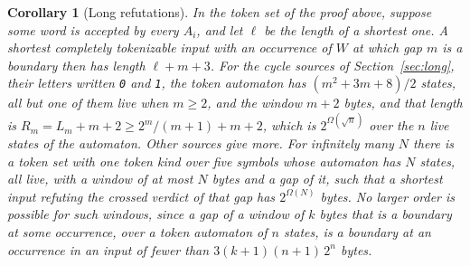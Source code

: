 \documentclass[11pt,a4paper]{article}
\theoremstyle{definition}
\theoremstyle{plain}
\newtheorem{corollary}{Corollary}
\newcommand{\code}[1]{\texttt{#1}}
\begin{document}
\begin{corollary}[Long refutations]
\label{cor:gap-long}
In the token set of the proof above, suppose some word is accepted by every $A_i$, and let $\ell$ be the length of a
shortest one. A shortest completely tokenizable input with an occurrence of $W$ at which gap $m$ is a boundary then has
length $\ell + m + 3$. For the cycle sources of Section~\ref{sec:long}, their letters written \code{0} and \code{1}, the
token automaton has $(m^2 + 3m + 8)/2$ states, all but one of them live when $m \geq 2$, and the window $m + 2$ bytes,
and that length is $R_m = L_m + m + 2 \geq 2^m / (m + 1) + m + 2$, which is $2^{\Omega(\sqrt n)}$ over the $n$ live
states of the automaton. Other sources give more. For infinitely many $N$ there is a token set with one token kind over
five symbols whose automaton has $N$ states, all live, with a window of at most $N$ bytes and a gap of it, such that a
shortest input refuting the crossed verdict of that gap has $2^{\Omega(N)}$ bytes. No larger order is possible for such
windows, since a gap of a window of $k$ bytes that is a boundary at some occurrence, over a token automaton of $n$
states, is a boundary at an occurrence in an input of fewer than $3 (k + 1)(n + 1)\, 2^n$ bytes.
\end{corollary}
\end{document}
